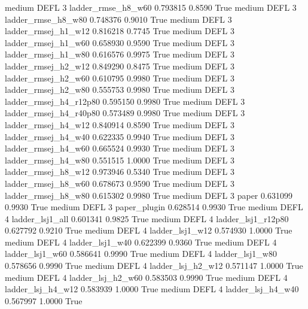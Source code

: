     medium     DEFL                 3     ladder_rmse_h8_w60   0.793815      0.8590    True
    medium     DEFL                 3     ladder_rmse_h8_w80   0.748376      0.9010    True
    medium     DEFL                 3    ladder_rmsej_h1_w12   0.816218      0.7745    True
    medium     DEFL                 3    ladder_rmsej_h1_w60   0.658930      0.9590    True
    medium     DEFL                 3    ladder_rmsej_h1_w80   0.616576      0.9975    True
    medium     DEFL                 3    ladder_rmsej_h2_w12   0.849290      0.8475    True
    medium     DEFL                 3    ladder_rmsej_h2_w60   0.610795      0.9980    True
    medium     DEFL                 3    ladder_rmsej_h2_w80   0.555753      0.9980    True
    medium     DEFL                 3 ladder_rmsej_h4_r12p80   0.595150      0.9980    True
    medium     DEFL                 3 ladder_rmsej_h4_r40p80   0.573489      0.9980    True
    medium     DEFL                 3    ladder_rmsej_h4_w12   0.840914      0.8590    True
    medium     DEFL                 3    ladder_rmsej_h4_w40   0.622335      0.9940    True
    medium     DEFL                 3    ladder_rmsej_h4_w60   0.665524      0.9930    True
    medium     DEFL                 3    ladder_rmsej_h4_w80   0.551515      1.0000    True
    medium     DEFL                 3    ladder_rmsej_h8_w12   0.973946      0.5340    True
    medium     DEFL                 3    ladder_rmsej_h8_w60   0.678673      0.9590    True
    medium     DEFL                 3    ladder_rmsej_h8_w80   0.615302      0.9980    True
    medium     DEFL                 3                  paper   0.631099      0.9930    True
    medium     DEFL                 3           paper_plugin   0.628514      0.9930    True
    medium     DEFL                 4        ladder_lsj1_all   0.601341      0.9825    True
    medium     DEFL                 4     ladder_lsj1_r12p80   0.627792      0.9210    True
    medium     DEFL                 4        ladder_lsj1_w12   0.574930      1.0000    True
    medium     DEFL                 4        ladder_lsj1_w40   0.622399      0.9360    True
    medium     DEFL                 4        ladder_lsj1_w60   0.586641      0.9990    True
    medium     DEFL                 4        ladder_lsj1_w80   0.578656      0.9990    True
    medium     DEFL                 4      ladder_lsj_h2_w12   0.571147      1.0000    True
    medium     DEFL                 4      ladder_lsj_h2_w60   0.583503      0.9990    True
    medium     DEFL                 4      ladder_lsj_h4_w12   0.583939      1.0000    True
    medium     DEFL                 4      ladder_lsj_h4_w40   0.567997      1.0000    True
